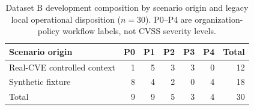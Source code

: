 \begin{table}[htbp]
\centering
\small
\caption{Dataset B development composition by scenario origin and legacy local operational disposition ($n=30$). P0--P4 are organization-policy workflow labels, not CVSS severity levels.}
\label{tab:transition_matrix}
\begin{tabular}{lrrrrrr}
\toprule
\textbf{Scenario origin} & \textbf{P0} & \textbf{P1} & \textbf{P2} & \textbf{P3} & \textbf{P4} & \textbf{Total} \\
\midrule
Real-CVE controlled context & 1 & 5 & 3 & 3 & 0 & 12 \\
Synthetic fixture            & 8 & 4 & 2 & 0 & 4 & 18 \\
\midrule
Total                        & 9 & 9 & 5 & 3 & 4 & 30 \\
\bottomrule
\end{tabular}
\end{table}
